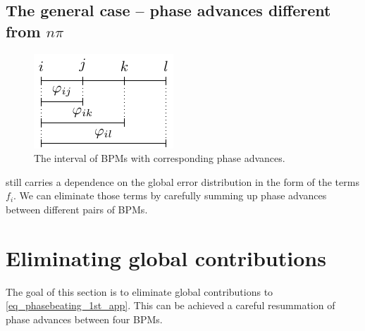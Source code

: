 \subsection{The general case -- phase advances different from \texorpdfstring{$n\pi$}{n*pi}}
\label{sec_generalcase}

\begin{figure}[htbp]
  \centering
    \includegraphics[width=.3\linewidth]{figIntervPhiIj}
  \caption{The interval of BPMs with corresponding phase advances.}
  \label{fig_interv_phi_ij}
\end{figure}
 still carries a dependence on the global error distribution in the form
of the terms $f_i$. We can eliminate those terms by carefully summing up phase advances between
different pairs of BPMs.


\section{Eliminating global contributions}
\label{sec_resummation}
The goal of this section is to eliminate global contributions to \eqref{eq_phasebeating_1st_app}.
This can be achieved a careful resummation of phase advances between four BPMs.

